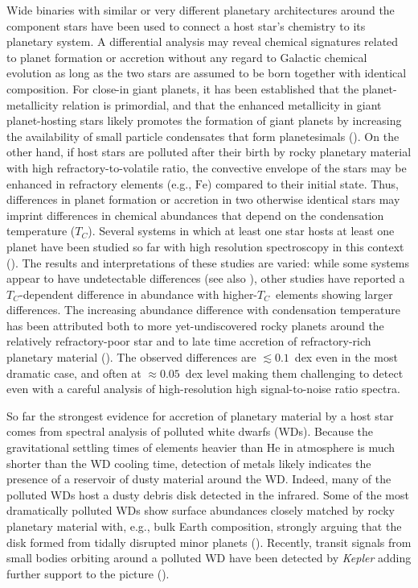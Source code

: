 \documentclass[modern, letterpaper]{aastex61}
\newcommand{\project}[1]{\textsl{#1}}
\newcommand*\elem[1]{\ensuremath{\mathrm{#1}}}
\newcommand{\Tcondens}{\ensuremath{T_C}}
\begin{document}
Wide binaries with similar or very different planetary architectures around the
component stars have been used to connect a host star's chemistry to its
planetary system.
A differential analysis may reveal chemical signatures related to planet
formation or accretion without any regard to Galactic chemical evolution as
long as the two stars are assumed to be born together with identical
composition.
For close-in giant planets, it has been established that the planet-metallicity
relation is primordial, and that the enhanced metallicity in giant
planet-hosting stars likely promotes the formation of giant planets by
increasing the availability of small particle condensates that form
planetesimals (\citealt{Fischer:2005aa}).
On the other hand, if host stars are polluted after their birth by rocky
planetary material with high refractory-to-volatile ratio, the convective
envelope of the stars may be enhanced in refractory elements (e.g., \elem{Fe})
compared to their initial state.
Thus, differences in planet formation or accretion in two otherwise identical
stars may imprint differences in chemical abundances that depend on the
condensation temperature (\Tcondens).
Several systems in which at least one star hosts at least one planet
have been studied so far with high resolution spectroscopy in this context
(\citealt{Teske:2013aa,Mack:2014aa,Liu:2014aa,Teske:2015aa,Saffe:2015aa,
  Ramirez:2015aa,Biazzo:2015aa,Mack:2016aa,Teske:2016aa,Teske:2016ab}).
The results and interpretations of these studies are varied:
while some systems appear to have undetectable differences
(see also \citealt{Desidera:2004aa,Gratton:2001aa}), other
studies have reported a \Tcondens-dependent difference in abundance
with higher-\Tcondens\ elements showing larger differences.
The increasing abundance difference with condensation temperature has been
attributed both to more yet-undiscovered rocky planets around the relatively
refractory-poor star and to late time accretion of refractory-rich planetary
material (\citealt{Ramirez:2015aa,Biazzo:2015aa}).
The observed differences are $\lesssim 0.1$~dex even in the most dramatic case,
and often at $\approx 0.05$~dex level making them challenging to detect even
with a careful analysis of high-resolution high signal-to-noise ratio spectra.

So far the strongest evidence for accretion of planetary material by a host
star comes from spectral analysis of polluted white dwarfs (WDs).
Because the gravitational settling times of elements heavier than \elem{He} in
atmosphere is much shorter than the WD cooling time, detection of metals likely
indicates the presence of a reservoir of dusty material around the WD.
Indeed, many of the polluted WDs host a dusty debris disk detected
in the infrared.
Some of the most dramatically polluted WDs show
surface abundances closely matched by rocky planetary material
with, e.g., bulk Earth composition, strongly arguing
that the disk formed from tidally disrupted minor planets
(\citealt{Zuckerman:2007aa,Klein:2010aa}).
Recently, transit signals from small bodies orbiting around a polluted WD
have been detected by \project{Kepler} adding further support to the picture
(\citealt{2015Natur.526..546V}).
\end{document}
